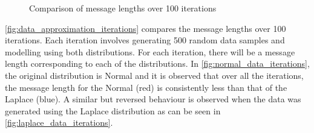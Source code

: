 \documentclass[wcp]{jmlr}
\begin{document}
\begin{figure}[!htb]
  \centering
    \hspace{0.5cm}
    \caption{Comparison of message lengths over 100 iterations}
    \label{fig:data_approximation_iterations}
\end{figure}

\autoref{fig:data_approximation_iterations} compares the message lengths over 100 iterations.
Each iteration involves generating 500 random data samples and modelling using both
distributions. For each iteration, there will be a message length corresponding to 
each of the distributions. In \ref{fig:normal_data_iterations}, the original 
distribution is Normal and it is observed
that over all the iterations, the message length for the Normal (red) is consistently less than that
of the Laplace (blue). A similar but reversed behaviour is observed when the data was generated
using the Laplace distribution as can be seen in \ref{fig:laplace_data_iterations}.
\end{document}
